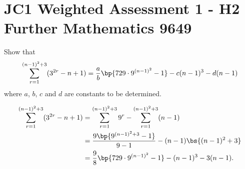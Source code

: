 \section{JC1 Weighted Assessment 1 - H2 Further Mathematics 9649}

\begin{problem}
    Show that \[\sum_{r=1}^{(n-1)^2 + 3} (3^{2r} - n + 1) = \frac{a}{b} \bp{729 \cdot 9^{(n-1)^2} - 1} - c(n-1)^3 - d(n-1)\] where $a$, $b$, $c$ and $d$ are constants to be determined.
\end{problem}
\begin{solution}
    \begin{align*}
        \sum_{r=1}^{(n-1)^2 + 3} (3^{2r} - n + 1) &= \sum_{r=1}^{(n-1)^2 + 3} 9^r  - \sum_{r=1}^{(n-1)^2 + 3}(n - 1)\\
        &= \frac{9\bp{9^{(n-1)^2 + 3} - 1}}{9-1} - (n-1)\bs{(n-1)^2 + 3}\\
        &= \frac98 \bp{729 \cdot 9^{(n-1)^2} - 1} - (n-1)^3 - 3(n-1).
    \end{align*}
\end{solution}

